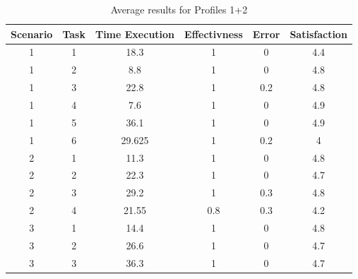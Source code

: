 \begin{table}[H]
  \begin{center}
    \begin{tabular}{||c|c|c|c|c|c||} %
      \textbf{Scenario} & \textbf{Task} & \textbf{Time Execution} & \textbf{Effectivness} & \textbf{Error} & \textbf{Satisfaction}\\
      
      \hline
        1 & 1 & 18.3 & 1 & 0 & 4.4\\
        1 & 2 & 8.8 & 1 & 0 & 4.8\\
        1 & 3 & 22.8 & 1 & 0.2 & 4.8\\
        1 & 4 & 7.6 & 1 & 0 & 4.9\\
        1 & 5 & 36.1 & 1 & 0 & 4.9\\
        1 & 6 & 29.625 & 1 & 0.2 & 4\\
        \hline
        2 & 1 & 11.3 & 1 & 0 & 4.8\\
        2 & 2 & 22.3 & 1 & 0 & 4.7\\
        2 & 3 & 29.2 & 1 & 0.3 & 4.8\\
        2 & 4 & 21.55 & 0.8 & 0.3 & 4.2\\
        \hline
        3 & 1 & 14.4 & 1 & 0 & 4.8\\
        3 & 2 & 26.6 & 1 & 0 & 4.7\\
        3 & 3 & 36.3 & 1 & 0 & 4.7\\
        \hline

    \end{tabular}
  \end{center}
  \caption{Average results for Profiles 1+2}
\end{table}



\begin{figure}[H]
  \centering
\end{figure}


